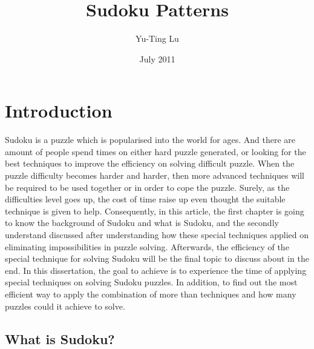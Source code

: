 \documentclass[11pt]{report}
\begin{document}
\title{Sudoku Patterns}
\author{Yu-Ting Lu}
\date{July 2011}
\maketitle

\tableofcontents



\chapter{Introduction}
\label{cha:Introduction}


Sudoku is a puzzle which is popularised into the world for ages. And there are amount of people spend times on either hard puzzle generated, or looking for the best techniques to improve the efficiency on solving difficult puzzle.
When the puzzle difficulty becomes harder and harder, then more advanced techniques will be required to be used together or in order to cope the puzzle. Surely, as the difficulties level goes up, the cost of time raise up even thought the suitable technique is given to help. Consequently, in this article, the first chapter is going to know the background of Sudoku and what is Sudoku, and the secondly understand discussed after understanding how these special techniques applied on eliminating impossibilities in puzzle solving. Afterwards, the efficiency of the special technique for solving Sudoku will be the final topic to discuss about in the end.
In this dissertation, the goal to achieve is to experience the time of applying special techniques on solving Sudoku puzzles. In addition, to find out the most efficient way to apply the combination of more than techniques and how many puzzles could it achieve to solve.


\section{What is Sudoku?}
\label{sec:whatissudoku}
\end{document}
